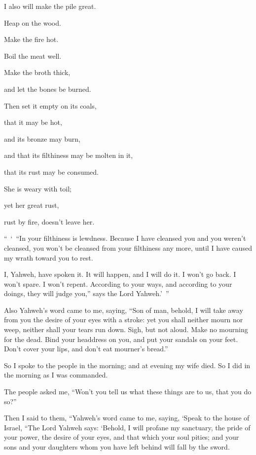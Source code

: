 {\par }{\QB I also will make the pile great.
\par }{\Q {}Heap on the wood.
\par }{\QB Make the fire hot.
\par }{\Q Boil the meat well.
\par }{\QB Make the broth thick,
\par }{\QB and let the bones be burned.
\par }{\Q {}Then set it empty on its coals,
\par }{\QB that it may be hot,
\par }{\Q and its bronze may burn,
\par }{\QB and that its filthiness may be molten in it,
\par }{\QB that its rust may be consumed.
\par }{\Q {}She is weary with toil;
\par }{\QB yet her great rust,
\par }{\QB rust by fire, doesn’t leave her.
\par }{\PP {}“ ‘ “In your filthiness is lewdness. Because I have cleansed you and you weren’t cleansed, you won’t be cleansed from your filthiness any more, until I have caused my wrath toward you to rest.
\par }{\PP {}I, Yahweh, have spoken it. It will happen, and I will do it. I won’t go back. I won’t spare. I won’t repent. According to your ways, and according to your doings, they will judge you,” says the Lord Yahweh.’ ”
\par }{\PP {}Also Yahweh’s word came to me, saying,
“Son of man, behold, I will take away from you the desire of your eyes with a stroke: yet you shall neither mourn nor weep, neither shall your tears run down.
Sigh, but not aloud. Make no mourning for the dead. Bind your headdress on you, and put your sandals on your feet. Don’t cover your lips, and don’t eat mourner’s bread.”
\par }{\PP {}So I spoke to the people in the morning; and at evening my wife died. So I did in the morning as I was commanded.
\par }{\PP {}The people asked me, “Won’t you tell us what these things are to us, that you do so?”
\par }{\PP {}Then I said to them, “Yahweh’s word came to me, saying,
‘Speak to the house of Israel, “The Lord Yahweh says: ‘Behold, I will profane my sanctuary, the pride of your power, the desire of your eyes, and that which your soul pities; and your sons and your daughters whom you have left behind will fall by the sword.
}
